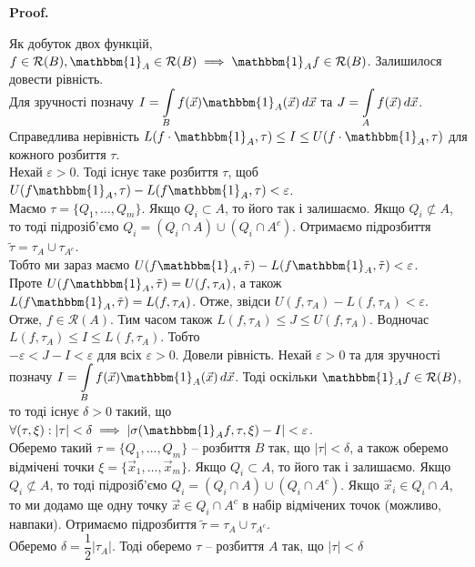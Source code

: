 \documentclass[a4paper, 10pt]{article}
\makeatletter
\def\qed{$\blacksquare$}
\theoremstyle{theoremdd}
\theoremstyle{theoremdd}
\theoremstyle{theoremdd}
\theoremstyle{theoremdd}
\theoremstyle{theoremdd}
\theoremstyle{theoremdd}
\theoremstyle{theoremdd}
\theoremstyle{theoremdd}
\theoremstyle{theoremdd}
\theoremstyle{theoremdd}
\theoremstyle{theoremdd}
\theoremstyle{theoremdd}
\theoremstyle{theoremdd}
\theoremstyle{theoremdd}
\theoremstyle{theoremdd}
\renewenvironment{proof}[1][Proof.\\]{\par
\pushQED{\hfill \qed}%
\normalfont \topsep6\p@\@plus6\p@\relax
\trivlist
\item\relax
{\bfseries
#1\@addpunct{.}}\hspace\labelsep\ignorespaces
}{%
\popQED\endtrivlist\@endpefalse
}
\makeatother
\begin{document}
\begin{proof}
Як добуток двох функцій, $f \in \mathcal{R}(B), \mathbbm{1}_A \in \mathcal{R}(B) \implies \mathbbm{1}_A f \in \mathcal{R}(B)$. Залишилося довести рівність.\\
Для зручності позначу $I = \displaystyle\int\displaylimits_B f(\vec{x})\mathbbm{1}_A(\vec{x})\,d\vec{x}$ та $J = \displaystyle\int\displaylimits_A f(\vec{x})\,d\vec{x}$. Справедлива нерівність $L(f \cdot \mathbbm{1}_A,\tau) \leq I \leq U(f \cdot \mathbbm{1}_A, \tau)$ для кожного розбиття $\tau$.\\
Нехай $\varepsilon > 0$. Тоді існує таке розбиття $\tau$, щоб $U(f \mathbbm{1}_A, \tau) - L(f \mathbbm{1}_A, \tau) < \varepsilon$.\\
Маємо $\tau = \{Q_1,\dots,Q_m\}$. Якщо $Q_i \subset A$, то його так і залишаємо. Якщо $Q_i \not\subset A$, то тоді підрозіб'ємо $Q_i = (Q_i \cap A) \cup (Q_i \cap A^c)$. Отримаємо підрозбиття $\tilde{\tau} = \tau_A \cup \tau_{A^c}$.\\
Тобто ми зараз маємо $U(f \mathbbm{1}_A, \tilde{\tau}) - L(f \mathbbm{1}_A, \tilde{\tau}) < \varepsilon$.\\
Проте $U(f \mathbbm{1}_A, \tilde{\tau}) = U(f,\tau_A)$, а також $L(f \mathbbm{1}_A, \tilde{\tau}) = L(f,\tau_A)$. Отже, звідси $U(f,\tau_A) - L(f,\tau_A) < \varepsilon$.\\
Отже, $f \in \mathcal{R}(A)$. Тим часом також $L(f,\tau_A) \leq J \leq U(f,\tau_A)$. Водночас $L(f,\tau_A) \leq I \leq L(f,\tau_A)$. Тобто\\
$-\varepsilon < J - I < \varepsilon$ для всіх $\varepsilon > 0$. Довели рівність.
\iffalse
Нехай $\varepsilon > 0$ та для зручності позначу $I = \displaystyle\int\displaylimits_B f(\vec{x})\mathbbm{1}_A(\vec{x})\,d\vec{x}$. Тоді оскільки $\mathbbm{1}_A f \in \mathcal{R}(B)$, то тоді існує $\delta > 0$ такий, що $\forall (\tau,\xi): |\tau| < \delta \implies |\sigma(\mathbbm{1}_A f, \tau, \xi) - I| < \varepsilon$.\\
Оберемо такий $\tau = \{Q_1,\dots,Q_m\}$ -- розбиття $B$ так, що $|\tau| < \delta$, а також оберемо відмічені точки $\xi = \{\vec{x}_1,\dots,\vec{x}_m\}$. Якщо $Q_i \subset A$, то його так і залишаємо. Якщо $Q_i \not\subset A$, то тоді підрозіб'ємо $Q_i = (Q_i \cap A) \cup (Q_i \cap A^c)$. Якщо $\vec{x}_i \in Q_i \cap A$, то ми додамо ще одну точку $\vec{x} \in Q_i \cap A^c$ в набір відмічених точок (можливо, навпаки). Отримаємо підрозбиття $\tilde{\tau} = \tau_A \cup \tau_{A^c}$.\\
Оберемо $\delta = \dfrac{1}{2} |\tau_A|$. Тоді оберемо $\tau$ -- розбиття $A$ так, що $|\tau| < \delta$

\end{proof}
\end{document}
